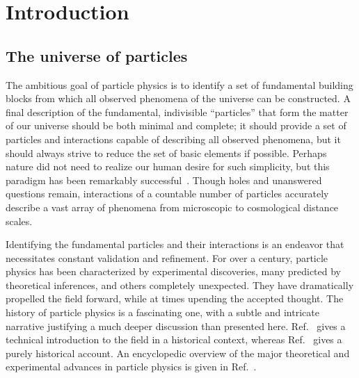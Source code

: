 \chapter{Introduction}
\label{ch:introduction}

\section{The universe of particles}

The ambitious goal of particle physics is to identify a 
set of fundamental building blocks from which all observed
phenomena of the universe can be constructed.
A final description of the fundamental, indivisible ``particles'' that
form the matter of our universe should be both minimal and 
complete; it should provide a set of particles and interactions capable of 
describing all observed phenomena, but it should always strive to reduce 
the set of basic elements if possible.
Perhaps nature did not need to realize our human desire for such simplicity,
but this paradigm has been remarkably successful~\cite{Griffiths:2008zz}. 
Though holes and unanswered
questions remain, interactions of a countable number of particles 
accurately describe a vast array of phenomena from 
microscopic to cosmological distance scales.

Identifying the fundamental particles and their interactions is an 
endeavor that necessitates constant validation and refinement.
For over a century, particle physics has been characterized by experimental
discoveries, many predicted by theoretical inferences, and others 
completely unexpected.
They have dramatically propelled the field forward,
while at times upending the accepted thought.
The history of particle physics is a fascinating one, with a subtle 
and intricate narrative justifying a much deeper discussion than presented
here. Ref.~\cite{Griffiths:2008zz} gives a technical introduction to the field in a historical
context, whereas Ref.~\cite{kragh2002quantum} gives a purely 
historical account. An encyclopedic overview of the major
theoretical and experimental advances in particle physics is given in Ref.~\cite{Ezhela:1996xi}.

